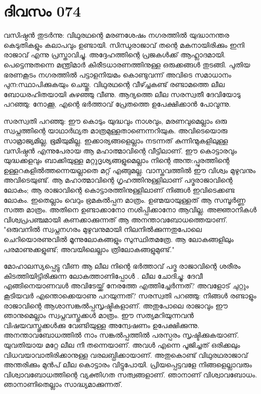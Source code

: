 \newpage
\section{ദിവസം 074}


വസിഷ്ഠന്‍ തുടര്‍ന്നു: വിഥുരഥന്റെ മരണശേഷം നഗരത്തില്‍ യുദ്ധാനന്തര കെടുതികളും കലാപവും ഉണ്ടായി. സിന്ധുരാജാവ്‌ തന്റെ മകനായിരിക്കും ഇനി രാജാവ്‌ എന്നു പ്രസ്താവിച്ചു. അദ്ദേഹത്തിന്റെ പ്രജകള്‍ക്ക്‌ ആഹ്ലാദമായി. പെട്ടെന്നുതന്നെ മന്ത്രിമാര്‍ കിരീടധാരണത്തിനുള്ള ഒരുക്കങ്ങള്‍ തുടങ്ങി. പുതിയ ഭരണകൂടം നഗരത്തില്‍ പട്ടാളനിയമം കൊണ്ടുവന്ന് അവിടെ സമാധാനം പുന:സ്ഥാപിക്കുകയും ചെയ്തു. വിഥുരഥന്റെ വീഴ്ച്ചകണ്ട്‌ രണ്ടാമത്തെ ലീല ബോധരഹിതയായി കുഴഞ്ഞു വീണു. ആദ്യത്തെ ലീല സരസ്വതീ ദേവിയോടു പറഞ്ഞു: നോക്കൂ, എന്റെ ഭര്‍ത്താവ്‌ പ്രേതത്തെ ഉപേക്ഷിക്കാന്‍ പോവുന്നു.

സരസ്വതി പറഞ്ഞു: ഈ കൊടും യുദ്ധവും നാശവും, മരണവുമെല്ലാം ഒരു സ്വപ്നത്തിന്റെ യാഥാര്‍ഥ്യത മാത്രമുള്ളതാണെന്നറിയുക. അവിടെയൊരു സാമ്രാജ്യമില്ല, ഭൂമിയുമില്ല. ഇക്കാര്യങ്ങളെല്ലാം നടന്നത്‌ കുന്നിന്മുകളിലുള്ള വസിഷ്ഠന്‍ എന്നുപേരായ ആ മഹാത്മാവിന്റെ വീട്ടിലാണ്‌. ഈ കൊട്ടാരവും യുദ്ധക്കളവും ബാക്കിയുള്ള മറ്റുദൃശ്യങ്ങളുമെല്ലാം നിന്റെ അന്ത:പ്പുരത്തിന്റെ ഉള്ളറകളില്‍ത്തന്നെയല്ലാതെ  മറ്റ് എങ്ങുമല്ല. വാസ്തവത്തില്‍ ഈ വിശ്വം മുഴുവനും അവിടെയുണ്ട്‌. ആ മഹാത്മാവിന്റെ  ഗൃഹത്തിനുള്ളിലാണ്‌ പദ്മരാജാവിന്റെ ലോകം; ആ രാജാവിന്റെ കൊട്ടാരത്തിനുള്ളിലാണ്‌ നിങ്ങള്‍ ഇവിടെക്കണ്ട ലോകം. ഇതെല്ലാം വെറും ഭ്രമകല്‍പ്പന മാത്രം. ഉണ്മയായുള്ളത്‌ ആ സമ്പൂര്‍ണ്ണ സത്ത മാത്രം. അതിനെ ഉണ്ടാക്കാനോ നശിപ്പിക്കാനോ ആവില്ല. അജ്ഞാനികള്‍ വിശ്വപ്രപഞ്ചമായി കണക്കാക്കുന്നത്‌ ആ അനന്താവബോധത്തെയാണ്‌. "ഒരുവനില്‍ സ്വപ്നനഗരം മുഴുവനുമായി നിലനില്‍ക്കുന്നതുപോലെ ചെറിയൊരണുവില്‍ മൂന്നുലോകങ്ങളും സുസ്ഥിതമത്രേ. ആ ലോകങ്ങളിലും പരമാണുക്കളുണ്ട്‌; അവയിലെല്ലാം ത്രിലോകങ്ങളുമുണ്ട്‌."

മോഹാലസ്യപ്പെട്ടു വീണ ആ ലീല നിന്റെ ഭര്‍ത്താവ്‌ പദ്മ രാജാവിന്റെ ശരീരം കിടത്തിയിട്ടിരിക്കുന്ന ലോകത്താണിപ്പോള്‍ . ലീല ചോദിച്ചു: ദേവീ എങ്ങിനെയാണവള്‍ അവിടേയ്ക്ക്‌ നേരത്തേ എത്തിച്ചേര്‍ന്നത്‌? അവളോട്‌ ചുറ്റും കൂടിയവര്‍ എന്തൊക്കെയാണു പറയുന്നത്‌? സരസ്വതി പറഞ്ഞു: നിങ്ങള്‍ രണ്ടാളും രാജാവിന്റെ ആശാസങ്കല്‍പ്പസൃഷ്ടികളാണ്‌. അതുപോലെ രാജാവും ഈ ഞാനുമെല്ലാം സ്വപ്നവസ്തുക്കള്‍ മാത്രം. ഈ സത്യമറിയുന്നവന്‍ വിഷയവസ്തുക്കള്‍ക്കു വേണ്ടിയുള്ള അന്വേഷണം ഉപേക്ഷിക്കുന്നു. അനന്താവബോധത്തില്‍ നാം സങ്കല്‍പ്പത്തില്‍ പരസ്പരം സൃഷ്ടിക്കുകയാണ്‌. യുവതിയായ മറ്റേ ലീല നീ തന്നെയാണ്‌. അവള്‍ എന്നെ പൂജിച്ചത്‌ ഒരിക്കലും വിധവയാവാതിരിക്കാനുള്ള വരലബ്ധിക്കായാണ്‌. അതുകൊണ്ട്‌ വിഥുരഥരാജാവ്‌ അന്തരിക്കും മുന്‍പ്‌ ലീല കൊട്ടാരം വിട്ടുപോയി. പ്രിയപ്പെട്ടവളേ നിങ്ങളെല്ലാവരും വിശ്വാവബോധത്തിന്റെ വ്യക്തിഗത സത്വങ്ങളാണ്‌. ഞാനാണ്‌ വിശ്വാവബോധം. ഞാനാണിതെല്ലാം സാദ്ധ്യമാക്കുന്നത്‌.

